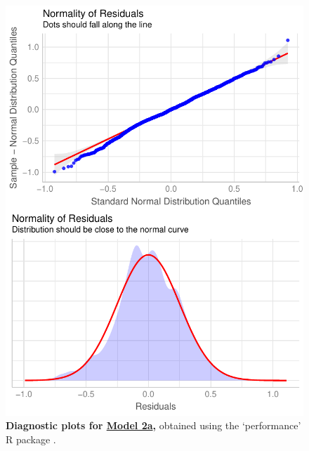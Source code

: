 \begin{figure}[h!]
\centering
\includegraphics[scale=0.7]{Supporting/Chapter3/Figures/Diagnostics/SI_diagnostics_Model2a}
\caption[Diagnostic plots for Model 2a]{\textbf{Diagnostic plots for \underline{Model 2a},} obtained using the `performance' R package \citep{performance}.}
\label{}
\end{figure}

\newpage

